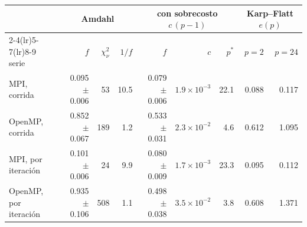 \begin{tabular}{l rr r rrr rr}
\toprule
 & \multicolumn{3}{c}{Amdahl} & \multicolumn{3}{c}{con sobrecosto $c\,(p-1)$} & \multicolumn{2}{c}{Karp--Flatt $e(p)$} \\
\cmidrule(lr){2-4}\cmidrule(lr){5-7}\cmidrule(lr){8-9}
serie & $f$ & $\chi^2_\nu$ & $1/f$ & $f$ & $c$ & $p^{*}$ & $p=2$ & $p=24$ \\
\midrule
MPI, corrida & 0.095 $\pm$ 0.006 & 53 & 10.5 & 0.079 $\pm$ 0.006 & $1.9\times10^{-3}$ & 22.1 & 0.088 & 0.117 \\
OpenMP, corrida & 0.852 $\pm$ 0.067 & 189 & 1.2 & 0.533 $\pm$ 0.031 & $2.3\times10^{-2}$ & 4.6 & 0.612 & 1.095 \\
MPI, por iteración & 0.101 $\pm$ 0.006 & 24 & 9.9 & 0.080 $\pm$ 0.009 & $1.7\times10^{-3}$ & 23.3 & 0.095 & 0.112 \\
OpenMP, por iteración & 0.935 $\pm$ 0.106 & 508 & 1.1 & 0.498 $\pm$ 0.038 & $3.5\times10^{-2}$ & 3.8 & 0.608 & 1.371 \\
\bottomrule
\end{tabular}
